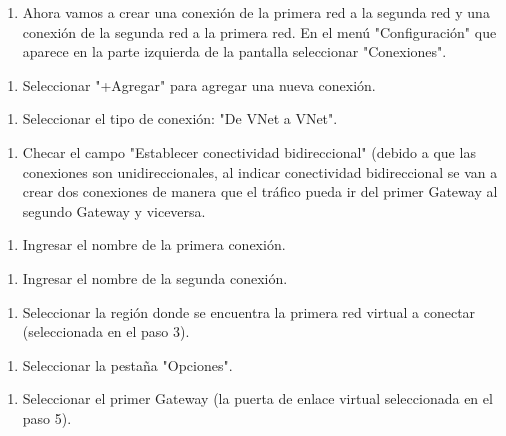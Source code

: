 \begin{enumerate}
\item Ahora vamos a crear una conexión de la primera red a la segunda red y una conexión de la segunda red a la primera red. En el menú "Configuración" que aparece en la parte izquierda de la pantalla seleccionar "Conexiones".
\end{enumerate}

\begin{enumerate}
\item Seleccionar "+Agregar" para agregar una nueva conexión.
\end{enumerate}

\begin{enumerate}
\item Seleccionar el tipo de conexión: "De VNet a VNet".
\end{enumerate}

\begin{enumerate}
\item Checar el campo "Establecer conectividad bidireccional" (debido a que las conexiones son unidireccionales, al indicar conectividad bidireccional se van a crear dos conexiones de manera que el tráfico pueda ir del primer Gateway al segundo Gateway y viceversa.
\end{enumerate}

\begin{enumerate}
\item Ingresar el nombre de la primera conexión.
\end{enumerate}

\begin{enumerate}
\item Ingresar el nombre de la segunda conexión.
\end{enumerate}

\begin{enumerate}
\item Seleccionar la región donde se encuentra la primera red virtual a conectar (seleccionada en el paso 3).
\end{enumerate}

\begin{enumerate}
\item Seleccionar la pestaña "Opciones".
\end{enumerate}

\begin{enumerate}
\item Seleccionar el primer Gateway (la puerta de enlace virtual seleccionada en el paso 5).
\end{enumerate}


